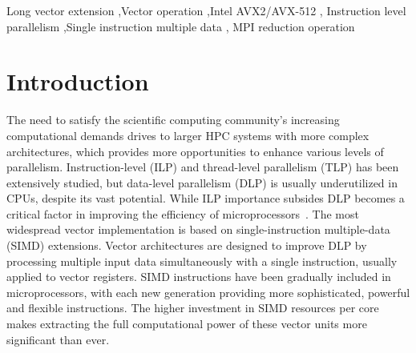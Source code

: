 \documentclass[5p,times,twocolumn]{elsarticle}
\begin{document}
\begin{keyword}
Long vector extension \sep Vector operation \sep Intel AVX2/AVX-512 \sep
Instruction level parallelism \sep Single instruction multiple data \sep
MPI reduction operation
\end{keyword}

\maketitle

\section{Introduction}\label{sec:intro}
The need to satisfy the scientific computing community's increasing
computational demands drives to larger HPC systems with more complex architectures,
which provides more opportunities to enhance various levels of parallelism.
%
Instruction-level (ILP) and thread-level parallelism (TLP) has been extensively
studied, but data-level parallelism (DLP) is usually underutilized in CPUs, despite its vast potential.
While ILP importance subsides DLP becomes a critical
factor in improving the efficiency of
microprocessors~\cite{energyeffects, HardwareEvents, espasa1998vector, Watson1972TheTA, clusterefficiency}.
The most widespread vector implementation is based on single-instruction multiple-data (SIMD) extensions.
Vector architectures are designed to improve DLP by processing multiple input data simultaneously with a single instruction, usually applied to vector registers.
SIMD instructions have been gradually included in
microprocessors, with each new generation providing more sophisticated, powerful and flexible
instructions. The higher investment in SIMD resources per core makes extracting the
full computational power of these vector units more significant than ever.
\end{document}
